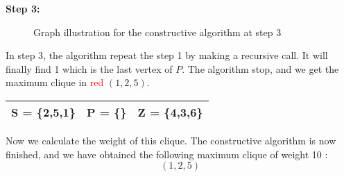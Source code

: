     \vspace{1\baselineskip}

    \begin{minipage}{\linewidth}
        \textbf{Step 3:} \newline
        \begin{minipage}{0.4\textwidth}
            \begin{figure}[H]
                \centering
                \caption{Graph illustration for the constructive algorithm at step 3}
                \label{fig:constructive-mewc-edge-step3}
            \end{figure}
        \end{minipage}
        \begin{minipage}{0.6\textwidth}
            In step 3, the algorithm repeat the step 1 by making a recursive call. It will finally find 1 which is the last vertex of $P$. The algorithm stop, and we get the maximum clique in \textcolor{red}{red} $(1,2,5)$.
    
            \begin{center}
                \begin{tabular}{|lll|}
                    \hline
                    S = \{2,5,1\} & P = \{\} & Z = \{4,3,6\} \\
                    \hline
                \end{tabular}
            \end{center}
        \end{minipage}
    \end{minipage}


\vspace{1\baselineskip}

    Now we calculate the weight of this clique. The constructive algorithm is now finished, and we have obtained the following maximum clique of weight 10 : $$(1,2,5)$$

\newpage

